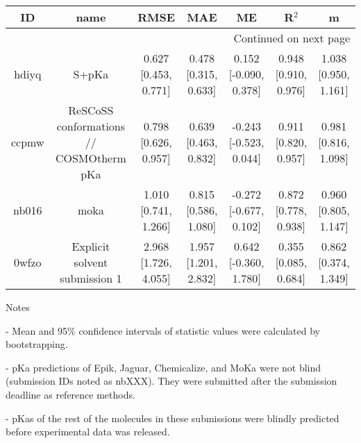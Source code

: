\documentclass{article}
\begin{document}
\begin{center}
\begin{longtable}{|ccccccc|}
\toprule
    ID &                                     name &                  RMSE &                   MAE &                      ME &                 R$^2$ &                     m \\
\midrule
\endhead
\midrule
\multicolumn{7}{r}{{Continued on next page}} \\
\midrule
\endfoot

\bottomrule
\endlastfoot
 hdiyq &                                    S+pKa &  0.627 [0.453, 0.771] &  0.478 [0.315, 0.633] &   0.152 [-0.090, 0.378] &  0.948 [0.910, 0.976] &  1.038 [0.950, 1.161] \\
 ccpmw &  ReSCoSS conformations // COSMOtherm pKa &  0.798 [0.626, 0.957] &  0.639 [0.463, 0.832] &  -0.243 [-0.523, 0.044] &  0.911 [0.820, 0.957] &  0.981 [0.816, 1.098] \\
 nb016 &                                     moka &  1.010 [0.741, 1.266] &  0.815 [0.586, 1.080] &  -0.272 [-0.677, 0.102] &  0.872 [0.778, 0.938] &  0.960 [0.805, 1.147] \\
 0wfzo &            Explicit solvent submission 1 &  2.968 [1.726, 4.055] &  1.957 [1.201, 2.832] &   0.642 [-0.360, 1.780] &  0.355 [0.085, 0.684] &  0.862 [0.374, 1.349] \\
\end{longtable}
\end{center}

Notes

- Mean and 95\% confidence intervals of statistic values were calculated by bootstrapping.

- pKa predictions of Epik, Jaguar, Chemicalize, and MoKa were not blind (submission IDs noted as nbXXX). They were submitted after the submission deadline as reference methods.

- pKas of the rest of the molecules in these submissions were blindly predicted before experimental data was released.
\end{document}
